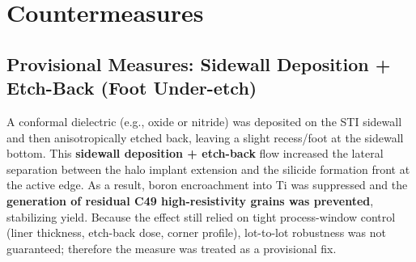 \documentclass[conference]{IEEEtran}
\begin{document}
\section{Countermeasures}
\subsection{Provisional Measures: Sidewall Deposition + Etch-Back (Foot Under-etch)}
A conformal dielectric (e.g., oxide or nitride) was deposited on the STI
sidewall and then anisotropically etched back, leaving a slight recess/foot
at the sidewall bottom. This \textbf{sidewall deposition + etch-back} flow
increased the lateral separation between the halo implant extension and the
silicide formation front at the active edge. As a result, boron encroachment
into Ti was suppressed and the \textbf{generation of residual C49 high-resistivity
grains was prevented}, stabilizing yield. Because the effect still relied on
tight process-window control (liner thickness, etch-back dose, corner profile),
lot-to-lot robustness was not guaranteed; therefore the measure was treated
as a provisional fix.
\end{document}
